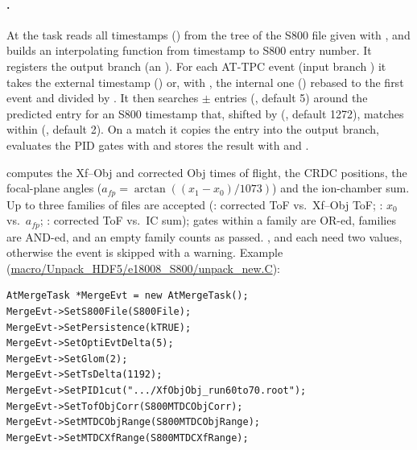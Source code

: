 \paragraph{.}
At  the task reads all timestamps () from the tree  of the S800 file given with
, and builds an interpolating function from timestamp to S800 entry number. It registers the output
branch  (an ). For each AT-TPC event (input branch ) it takes the
external timestamp () or, with , the internal one
() rebased to the first event and divided by . It then searches
$\pm$ entries (, default 5) around the predicted entry for an S800 timestamp
that, shifted by  (, default 1272), matches within  (,
default 2). On a match it copies the  entry into the output branch, evaluates the PID gates with
 and stores the result with  and .

 computes the Xf--Obj and corrected Obj times of flight, the CRDC positions, the focal-plane angles
($a_{fp} = \arctan((x_1-x_0)/1073)$) and the ion-chamber sum. Up to three families of  files are accepted
(: corrected ToF vs.\ Xf--Obj ToF; : $x_0$ vs.\ $a_{fp}$; :
corrected ToF vs.\ IC sum); gates within a family are OR-ed, families are AND-ed, and an empty family counts as
passed. ,  and  each need two values, otherwise the
event is skipped with a warning. Example (\url{macro/Unpack_HDF5/e18008_S800/unpack_new.C}):
\begin{verbatim}
AtMergeTask *MergeEvt = new AtMergeTask();
MergeEvt->SetS800File(S800File);
MergeEvt->SetPersistence(kTRUE);
MergeEvt->SetOptiEvtDelta(5);
MergeEvt->SetGlom(2);
MergeEvt->SetTsDelta(1192);
MergeEvt->SetPID1cut(".../XfObjObj_run60to70.root");
MergeEvt->SetTofObjCorr(S800MTDCObjCorr);
MergeEvt->SetMTDCObjRange(S800MTDCObjRange);
MergeEvt->SetMTDCXfRange(S800MTDCXfRange);
\end{verbatim}

